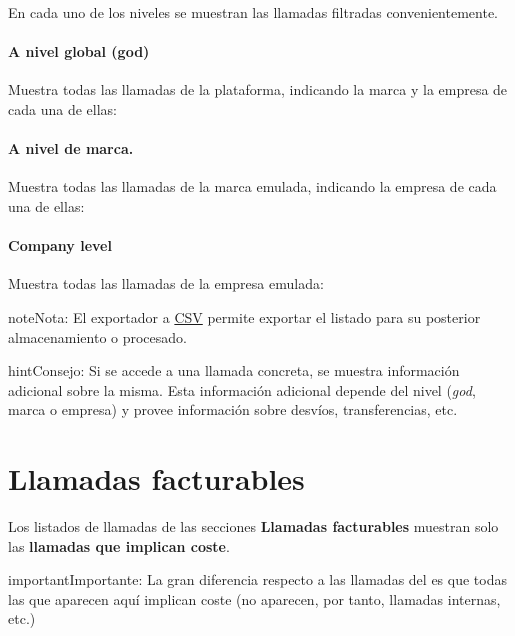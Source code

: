 \documentclass[letterpaper,10pt,spanish]{sphinxmanual}
\begin{document}
En cada uno de los niveles se muestran las llamadas filtradas convenientemente.
\paragraph{A nivel global (god)}

Muestra todas las llamadas de la plataforma, indicando la marca y la empresa de cada una de ellas:

\noindent{}
\paragraph{A nivel de marca.}

Muestra todas las llamadas de la marca emulada, indicando la empresa de cada una de ellas:

\noindent{}
\paragraph{Company level}

Muestra todas las llamadas de la empresa emulada:

\noindent{}

\begin{notice}{note}{Nota:}
El exportador a \href{https://es.wikipedia.org/wiki/CSV}{CSV} permite exportar el listado para su posterior almacenamiento o procesado.
\end{notice}

\begin{notice}{hint}{Consejo:}
Si se accede a una llamada concreta, se muestra información adicional sobre la misma. Esta información adicional depende del nivel (\emph{god}, marca o empresa) y provee información sobre desvíos, transferencias, etc.
\end{notice}


\section{Llamadas facturables}
\label{billing_and_invoices/billable_calls::doc}\label{billing_and_invoices/billable_calls:billable-calls}\label{billing_and_invoices/billable_calls:id1}
Los listados de llamadas de las secciones \textbf{Llamadas facturables} muestran solo las \textbf{llamadas que implican coste}.

\begin{notice}{important}{Importante:}
La gran diferencia respecto a las llamadas del {\hyperref[billing_and_invoices/call_registry:call\string-registry]{}} es que todas las que aparecen aquí implican coste (no aparecen, por tanto, llamadas internas, etc.)
\end{notice}
\end{document}
